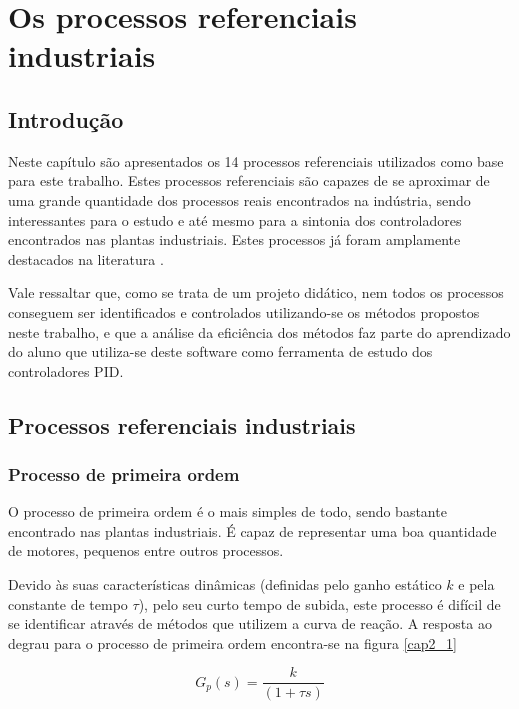 \chapter{Os processos referenciais industriais
    \label{cap:processos-referenciais}}

\section{Introdução}

Neste capítulo são apresentados os 14 processos referenciais utilizados
como base para este trabalho. Estes processos referenciais são capazes de se
aproximar de uma grande quantidade dos processos reais encontrados na indústria,
sendo interessantes para o estudo e até mesmo para a sintonia dos controladores
encontrados nas plantas industriais. Estes processos já foram amplamente destacados
na literatura \cite{Isermann:1981:DCS:539455} \cite{ast+hagg100}.

Vale ressaltar que, como se trata de um projeto didático, nem todos os processos
conseguem ser identificados e controlados utilizando-se os métodos propostos
neste trabalho, e que a análise da eficiência dos métodos faz parte do aprendizado
do aluno que utiliza-se deste software como ferramenta de estudo dos controladores
\acs{PID}.

\section{Processos referenciais industriais}

\subsection{Processo de primeira ordem}
    
    O processo de primeira ordem é o mais simples de todo, sendo bastante encontrado
    nas plantas industriais. É capaz de representar uma boa quantidade de motores,
    pequenos entre outros processos.
    
    Devido às suas características dinâmicas (definidas pelo ganho estático $k$ e
    pela constante de tempo $\tau$), pelo seu curto tempo de subida, este processo
    é difícil de se identificar através de métodos que utilizem a curva de reação.
    A resposta ao degrau para o processo de primeira ordem encontra-se na figura
    \ref{cap2_1}
    
    \begin{equation}
        G_p(s) = \frac{k}{(1+\tau s)}
    \end{equation}
    
